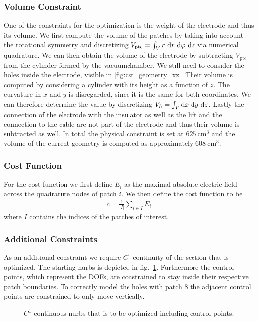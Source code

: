 \subsubsection{Volume Constraint}
One of the constraints for the optimization is the weight of the electrode and thus its volume.
We first compute the volume of the patches by taking into account the rotational symmetry and discretizing $V_{\mathrm{ptc}} = \int_V r\ \mathrm{d} r\ \mathrm{d} \varphi\ \mathrm{d} z$ via numerical quadrature. We can then obtain the volume of the electrode by subtracting $V_{\mathrm{ptc}}$ from the cylinder formed by the vacuumchamber.
We still need to consider the holes inside the electrode, visible in \ref{fig:cst_geometry_xz}. Their volume is computed by considering a cylinder with its height as a function of $z$. The curvature in $x$ and $y$ is disregarded, since it is the same for both coordinates. We can therefore determine the value by discretizing $V_{h} = \int_V \mathrm{d} x\ \mathrm{d} y\ \mathrm{d} z$.
Lastly the connection of the electrode with the insulator as well as the lift and the connection to the cable are not part of the electrode and thus their volume is subtracted as well.
In total the physical constraint is set at $625\ \mathrm{cm}^3$ and the volume of the current geometry is computed as approximately $608\ \mathrm{cm}^3$.

\subsubsection{Cost Function}
For the cost function we first define $E_i$ as the maximal absolute electric field across the quadrature nodes of patch $i$.
We then define the cost function to be
\begin{align}
   c = \frac{1}{|I|} \sum_{i \in I} E_i
\end{align}
where $I$ contains the indices of the patches of interest.

\subsubsection{Additional Constraints}
As an additional constraint we require $C^1$ continuity of the section that is optimized. The starting nurbs is depicted in fig.~\ref{fig:nurbs}. Furthermore the control points, which represent the DOFs, are constrained to stay inside their respective patch boundaries. To correctly model the holes with patch 8 the adjacent control points are constrained to only move vertically.

\begin{center}
\begin{figure}[H]
  
  \caption{$C^1$ continuous nurbs that is to be optimized including control points.}
  \label{fig:nurbs}
\end{figure}
\end{center}

